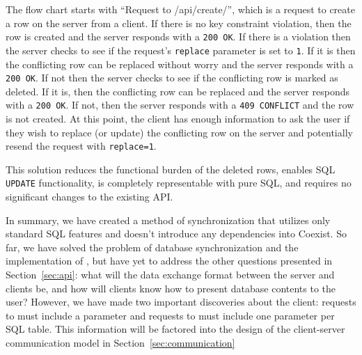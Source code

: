 The flow chart starts with ``Request to /api/create/'', which is a request
to create a row on the server from a client. If there is no key constraint
violation, then the row is created and the server responds with a \texttt{200
OK}. If there is a violation then the server checks to see if the request's
\texttt{replace} parameter is set to \texttt{1}. If it is then the conflicting
row can be replaced without worry and the server responds with a \texttt{200
OK}.  If not then the server checks to see if the conflicting row is marked as
deleted. If it is, then the conflicting row can be replaced and the server
responds with a \texttt{200 OK}. If not, then the server responds with a
\texttt{409 CONFLICT} and the row is not created. At this point, the client has
enough information to ask the user if they wish to replace (or update) the
conflicting row on the server and potentially resend the request with
\texttt{replace=1}. 
 
This solution reduces the functional burden of the deleted rows, enables SQL
\texttt{UPDATE} functionality, is completely representable with pure SQL, and
requires no significant changes to the existing API. 



In summary, we have created a method of synchronization that utilizes
only standard SQL features and doesn't introduce any dependencies into Coexist. So far,
we have solved the problem of database synchronization and the implementation of
\sync, but have yet to address
the other questions presented in Section~\ref{sec:api}: what will the data
exchange format between the server and clients be, and how will clients know how
to present database contents to the user? However, we have made two important
discoveries about the client: requests to \create must include a
 parameter and requests to \sync must include one 
parameter per SQL table. This information will be factored into the design of
the client-server communication model in Section~\ref{sec:communication}



